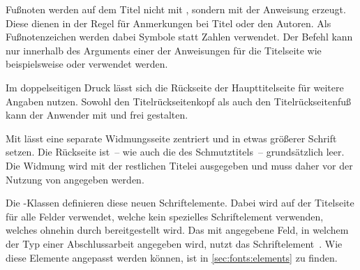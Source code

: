 \begin{Declaration*}{}
\begin{Declaration*}{}
\begin{Declaration*}{}
\begin{Declaration}{}
\begin{Declaration}{}
\begin{Declaration}{}
\begin{Declaration}{}
\begin{Declaration}{}
\begin{Declaration}{}
\begin{Declaration}{}
\begin{Declaration}{}
\begin{Declaration}{}
Fußnoten werden auf dem Titel nicht mit , sondern mit der 
Anweisung  erzeugt. Diese dienen in der Regel für Anmerkungen bei 
Titel oder den Autoren. Als Fußnotenzeichen werden dabei Symbole statt Zahlen 
verwendet. Der Befehl  kann nur innerhalb des Arguments einer 
der Anweisungen für die Titelseite wie beispielsweise  oder 
 verwendet werden.

%
Im doppelseitigen Druck lässt sich die Rückseite der Haupttitelseite für 
weitere Angaben nutzen. Sowohl den Titelrückseitenkopf als auch den
Titelrückseitenfuß kann der Anwender mit  und 
 frei gestalten.

Mit  lässt eine separate Widmungsseite zentriert und in etwas 
größerer Schrift setzen. Die Rückseite ist~-- wie auch die des Schmutztitels~-- 
grundsätzlich leer. Die Widmung wird mit der restlichen Titelei ausgegeben und 
muss daher vor der Nutzung von  angegeben werden.
\end{Declaration}
\end{Declaration}
\end{Declaration}
\end{Declaration}
\end{Declaration}
\end{Declaration}
\end{Declaration}
\end{Declaration}
\end{Declaration}

\begin{Declaration}[v2.02]{}
\begin{Declaration}[v2.02]{}
\printdeclarationlist%
%
%
Die \TUDScript-Klassen definieren diese neuen Schriftelemente. Dabei wird 
 auf der Titelseite für alle Felder verwendet, welche kein 
spezielles Schriftelement verwenden, welches ohnehin durch \KOMAScript{} 
bereitgestellt wird. Das mit  angegebene Feld, in welchem der Typ 
einer Abschlussarbeit angegeben wird, nutzt das Schriftelement~. 
Wie diese Elemente angepasst werden können, ist in \autoref{sec:fonts:elements} 
zu finden. 
\end{Declaration}
\end{Declaration}
%



\end{Declaration*}
\end{Declaration*}
\end{Declaration*}
